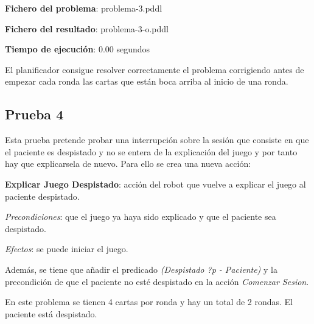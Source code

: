 \documentclass{uc3mpracticas}
\begin{document}
    \vspace{2mm}

    \textbf{Fichero del problema}: problema-3.pddl

    \textbf{Fichero del resultado}: problema-3-o.pddl

    \textbf{Tiempo de ejecución}: 0.00 segundos

  \vspace{3mm}

  El planificador consigue resolver correctamente el problema corrigiendo antes de empezar cada ronda las cartas que están boca arriba al inicio de una ronda.


  \subsection{Prueba 4}

  Esta prueba pretende probar una interrupción sobre la sesión que consiste en que el paciente es despistado y no se entera de la explicación del juego y por tanto hay que explicarsela de nuevo. Para ello se crea una nueva acción:

  \vspace{2mm}

  \textbf{Explicar Juego Despistado}: acción del robot que vuelve a explicar el juego al paciente despistado.

  \vspace{1mm}

    \textit{Precondiciones}: que el juego ya haya sido explicado y que el paciente sea despistado.

    \vspace{1mm}

    \textit{Efectos}: se puede iniciar el juego.


  \vspace{2mm}

  Además, se tiene que añadir el predicado \textit{(Despistado ?p - Paciente)} y la precondición de que el paciente no esté despistado en la acción \textit{Comenzar Sesion}.

  \vspace{3mm}

  En este problema se tienen 4 cartas por ronda y hay un total de 2 rondas. El paciente está despistado.
\end{document}
